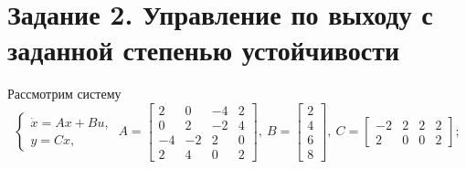 \documentclass[a4paper, 12pt]{article}
\begin{document}
    \section{Задание 2. Управление по выходу с заданной степенью устойчивости}
    Рассмотрим систему
    $$
    \begin{cases}
        \dot{x}=Ax+Bu,\\
        y=Cx,
    \end{cases}\ A=\begin{bmatrix}
        2 &0 &-4 &2\\
        0 &2 &-2 &4\\
        -4 &-2 &2 &0\\
        2 &4 &0 &2
    \end{bmatrix},\ B=\begin{bmatrix}
        2\\4\\6\\8
    \end{bmatrix},\ C=\begin{bmatrix}
        -2 &2 &2 &2\\
        2 &0 &0 &2
    \end{bmatrix};
    $$
\end{document}
